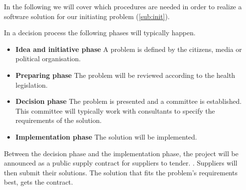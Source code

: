 In the following we will cover which procedures are needed in order to realize a software solution for our initiating problem (\cref{sub:init}).

In a decision process the following phases will typically happen. \cite{Sjaelland}


\begin{itemize}
  \setlength{\itemsep}{1pt}
  \setlength{\parskip}{0pt}
  \setlength{\parsep}{0pt}
	\item \textbf{Idea and initiative phase} A problem is defined by the citizens, media or political organisation.
	\item \textbf{Preparing phase} The problem will be reviewed according to the health legislation.
	\item \textbf{Decision phase} The problem is presented and a committee is established. This committee will typically work with consultants to specify the requirements of the solution.
	\item \textbf{Implementation phase} The solution will be implemented. 
\end{itemize}


Between the decision phase and the implementation phase, the project will be announced as a public supply contract for suppliers to tender. \cite{Union2004}. Suppliers will then submit their solutions. The solution that fits the problem's requirements best, gets the contract. 
